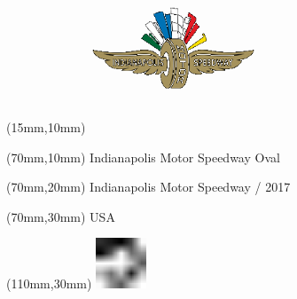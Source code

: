 \null\newpage
\begin{textblock*}{50mm}(15mm,10mm)%
\includegraphics[width=50mm]{LG/IND.png}
\end{textblock*}
\begin{textblock*}{130mm}(70mm,10mm)%
{\fontsize{20}{20}\selectfont Indianapolis Motor Speedway Oval}\\
\end{textblock*}
\begin{textblock*}{120mm}(70mm,20mm)%
{\fontsize{16}{16}\selectfont Indianapolis Motor Speedway / 2017}\\
\end{textblock*}
\begin{textblock*}{120mm}(70mm,30mm)%
{\fontsize{12}{12}\selectfont USA}
\end{textblock*}
\begin{textblock*}{30mm}(110mm,30mm)%
\centering
\includegraphics[height=15mm]{icons/fa-rotate-left.pdf}
\end{textblock*}
